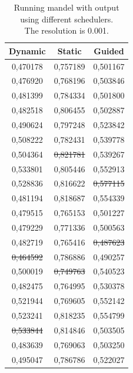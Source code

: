 \documentclass[a4paper]{article}
\begin{document}
\begin{table}[h]
	\caption{Running mandel with output using different schedulers.\\The resolution is 0.001.}
	\label{table:mandel_schedulers}
	\begin{center}
		\begin{tabular}{| c | c | c |}
			\hline
			Dynamic & Static & Guided\\ 
			\hline
			0,470178 & 0,757189 & 0,501167\\ 
			0,476920 & 0,768196 & 0,503846\\ 
			0,481399 & 0,784334 & 0,501800\\ 
			0,482518 & 0,806455 & 0,502887\\ 
			0,490624 & 0,797248 & 0,523842\\ 
			0,508222 & 0,782431 & 0,539778\\ 
			0,504364 & \st{0,821781} & 0,539267\\ 
			0,533801 & 0,805446 & 0,552913\\ 
			0,528836 & 0,816622 & \st{0,577115}\\ 
			0,481194 & 0,818687 & 0,554339\\ 
			0,479515 & 0,765153 & 0,501227\\ 
			0,479229 & 0,771336 & 0,500563\\ 
			0,482719 & 0,765416 & \st{0,487623}\\ 
			\st{0,464592} & 0,786886 & 0,490257\\ 
			0,500019 & \st{0,749763} & 0,540523\\ 
			0,482475 & 0,764995 & 0,530378\\ 
			0,521944 & 0,769605 & 0,552142\\ 
			0,523241 & 0,818235 & 0,554799\\ 
			\st{0,533844} & 0,814846 & 0,503505\\ 
			0,483639 & 0,769063 & 0,503250\\ 
			\hline
			0,495047 & 0,786786 & 0,522027\\ 
			\hline
		\end{tabular}
	\end{center}
\end{table}
\end{document}

